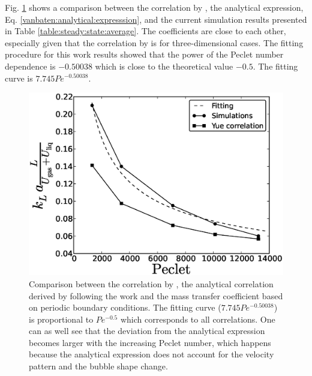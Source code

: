 \documentclass[preprint,12pt]{elsarticle}
\begin{document}
Fig. \ref{fig:volume:mass:coefficient} shows a comparison between the correlation by
\citet{yue-mass}, the analytical expression, Eq. \ref{vanbaten:analytical:expresssion}, and the current
simulation results presented in Table
\ref{table:steady:state:average}. The coefficients are close to each other, especially given that
the correlation by \citet{yue-mass} is for three-dimensional cases. The fitting procedure for this work results showed
that the power of
the Peclet number dependence  is $-0.50038$ which is close to the theoretical value $-0.5$.  The fitting curve is $7.745 Pe^{-0.50038}$.
\begin{figure}[htb!]
\includegraphics[width=\textwidth]{Figures/correlations_comparison.eps}
\caption{Comparison between the correlation by \citet{yue-mass}, the analytical correlation derived by following the work
\cite{irandoust} and the mass transfer coefficient based
on periodic boundary conditions. The fitting curve ($7.745 Pe^{-0.50038}$) is proportional to $Pe^{-0.5}$ which corresponds
to all correlations. One can as well see that the deviation from the analytical expression becomes
larger with the increasing Peclet number, which happens because the analytical expression does
 not account for the velocity pattern and the bubble shape change.\label{fig:volume:mass:coefficient}}
\end{figure}
\end{document}
